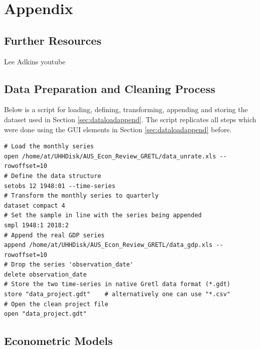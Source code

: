 \documentclass[11pt]{article}
\begin{document}


\newpage

\appendix
\setcounter{table}{0}
\renewcommand{\thetable}{A\arabic{table}}
\setcounter{figure}{0}
\renewcommand{\thefigure}{A\arabic{figure}}

\section{Appendix}

\subsection{Further Resources}
Lee Adkins
youtube


\subsection{Data Preparation and Cleaning Process}
\label{sec:datapre}
Below is a script for loading, defining, transforming, appending and storing the dataset used in Section \ref{sec:dataloadappend}. The script replicates all steps which were done using the GUI elements in Section \ref{sec:dataloadappend} before.

\begin{Verbatim}[baselinestretch=0.75]
# Load the monthly series
open /home/at/UHHDisk/AUS_Econ_Review_GRETL/data_unrate.xls --rowoffset=10
# Define the data structure
setobs 12 1948:01 --time-series
# Transform the monthly series to quarterly
dataset compact 4
# Set the sample in line with the series being appended
smpl 1948:1 2018:2
# Append the real GDP series
append /home/at/UHHDisk/AUS_Econ_Review_GRETL/data_gdp.xls --rowoffset=10
# Drop the series 'observation_date'
delete observation_date
# Store the two time-series in native Gretl data format (*.gdt)
store "data_project.gdt"	# alternatively one can use "*.csv"
# Open the clean project file
open "data_project.gdt"
\end{Verbatim}


\subsection{Econometric Models}
\end{document}
